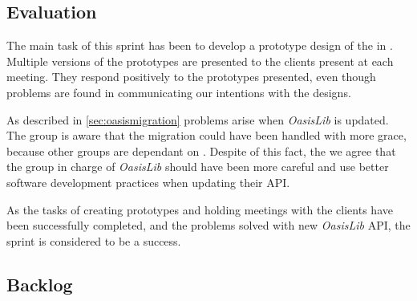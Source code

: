 \subsection{Evaluation}
The main task of this sprint has been to develop a prototype design of the \settingsactivity in \launcher.
Multiple versions of the prototypes are presented to the clients present at each meeting.
They respond positively to the prototypes presented, even though problems are found in communicating our intentions with the designs.

As described in \cref{sec:oasismigration} problems arise when \textit{OasisLib} is updated.
The group is aware that the migration could have been handled with more grace, because other groups are dependant on \launcher.
Despite of this fact, the we agree that the group in charge of \textit{OasisLib} should have been more careful and use better software development practices when updating their API.

As the tasks of creating prototypes and holding meetings with the clients have been successfully completed, and the problems solved with new \textit{OasisLib} API, the sprint is considered to be a success.

\subsection{Backlog}\label{sec:sprint2:backlog}
